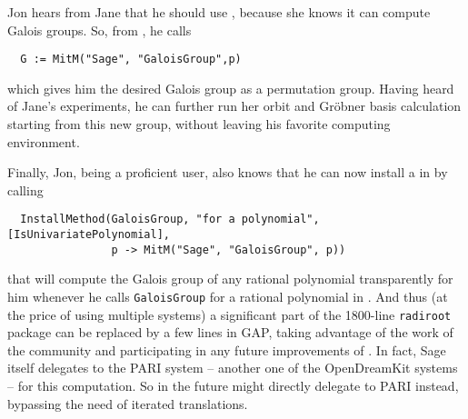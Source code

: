 Jon hears from Jane that he should use \Sage, because she knows it can
compute Galois groups. So, from \GAP, he calls
\begin{lstlisting}
  G := MitM("Sage", "GaloisGroup",p)
\end{lstlisting}
which gives him the desired
Galois group as a \GAP permutation group. Having heard of Jane's
experiments, he can further run her orbit and Gröbner basis
calculation starting from this new group, without leaving his
favorite computing environment.

Finally, Jon, being a proficient \GAP user, also knows that he can now install a  in \GAP by calling 
\begin{lstlisting}
  InstallMethod(GaloisGroup, "for a polynomial", [IsUnivariatePolynomial], 
                p -> MitM("Sage", "GaloisGroup", p))
\end{lstlisting}
that will compute the Galois group of any rational polynomial transparently for him whenever he calls \lstinline|GaloisGroup| for a rational polynomial in \GAP. 
And thus (at the price of using multiple systems) a significant part of the 1800-line \lstinline|radiroot| package can be replaced by a few lines in GAP, taking advantage of the work of the \Sage community and participating in any future improvements of \Sage. 
In fact, Sage itself delegates to the PARI system -- another one of the OpenDreamKit systems -- for this computation.  So in the future \GAP might directly delegate to PARI instead, bypassing the need of iterated translations.


